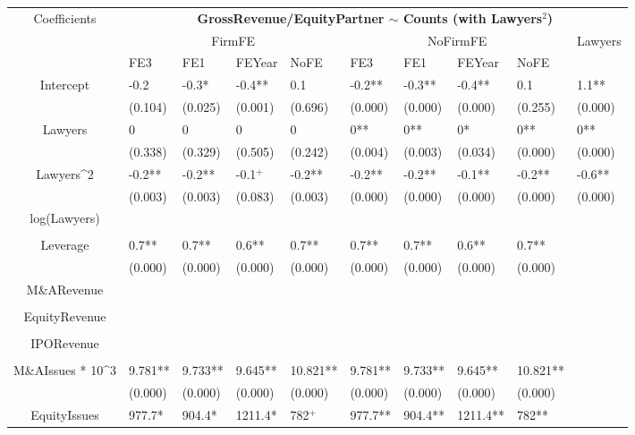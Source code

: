\documentclass{article}
\begin{document}
\begin{table}[H]
\centering
\begin{tabular}{|clllllllll|}
\hline
\multirow{3}{*}{Coefficients} & \multicolumn{9}{c|}{\textbf{GrossRevenue/EquityPartner $\sim$ Counts (with Lawyers$^2$)}} \\
\cline{2-10}
& \multicolumn{4}{c}{FirmFE} & \multicolumn{4}{c}{NoFirmFE} & \multirow{2}{*}{Lawyers} \\
\cline{2-9}
& FE3 & FE1 & FEYear & NoFE & FE3 & FE1 & FEYear & NoFE &  \\
\hline
 
Intercept & -0.2 & -0.3* & -0.4** & 0.1 & -0.2** & -0.3** & -0.4** & 0.1 & 1.1** \\ 
   & (0.104) & (0.025) & (0.001) & (0.696) & (0.000) & (0.000) & (0.000) & (0.255) & (0.000) \\ 
  Lawyers & 0 & 0 & 0 & 0 & 0** & 0** & 0* & 0** & 0** \\ 
   & (0.338) & (0.329) & (0.505) & (0.242) & (0.004) & (0.003) & (0.034) & (0.000) & (0.000) \\ 
  Lawyers^2 & -0.2** & -0.2** & -0.1$^{+}$ & -0.2** & -0.2** & -0.2** & -0.1** & -0.2** & -0.6** \\ 
   & (0.003) & (0.003) & (0.083) & (0.003) & (0.000) & (0.000) & (0.000) & (0.000) & (0.000) \\ 
  log(Lawyers) &  &  &  &  &  &  &  &  &  \\ 
   &  &  &  &  &  &  &  &  &  \\ 
  Leverage & 0.7** & 0.7** & 0.6** & 0.7** & 0.7** & 0.7** & 0.6** & 0.7** &  \\ 
   & (0.000) & (0.000) & (0.000) & (0.000) & (0.000) & (0.000) & (0.000) & (0.000) &  \\ 
  M\&ARevenue &  &  &  &  &  &  &  &  &  \\ 
   &  &  &  &  &  &  &  &  &  \\ 
  EquityRevenue &  &  &  &  &  &  &  &  &  \\ 
   &  &  &  &  &  &  &  &  &  \\ 
  IPORevenue &  &  &  &  &  &  &  &  &  \\ 
   &  &  &  &  &  &  &  &  &  \\ 
  M\&AIssues * 10^3 & 9.781** & 9.733** & 9.645** & 10.821** & 9.781** & 9.733** & 9.645** & 10.821** &  \\ 
   & (0.000) & (0.000) & (0.000) & (0.000) & (0.000) & (0.000) & (0.000) & (0.000) &  \\ 
  EquityIssues & 977.7* & 904.4* & 1211.4* & 782$^{+}$ & 977.7** & 904.4** & 1211.4** & 782** &  \\ 

\end{tabular}
\end{table}
\end{document}
